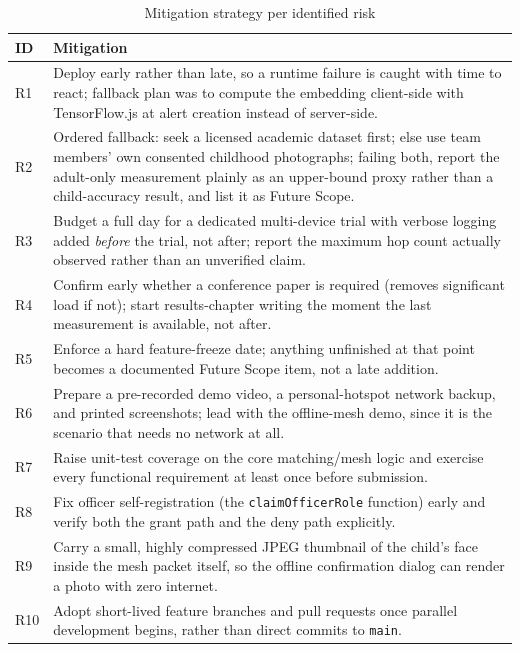 \documentclass[12pt,a4paper,oneside]{report}
\newcommand{\code}[1]{\texttt{#1}}
\begin{document}
\begin{table}[H]
\centering
\caption{Mitigation strategy per identified risk}
\begin{tabular}{|p{0.8cm}|p{11.2cm}|}
\hline
\textbf{ID} & \textbf{Mitigation} \\
\hline
R1 & Deploy early rather than late, so a runtime failure is caught with time to react; fallback plan was to compute the embedding client-side with TensorFlow.js at alert creation instead of server-side. \\ \hline
R2 & Ordered fallback: seek a licensed academic dataset first; else use team members' own consented childhood photographs; failing both, report the adult-only measurement plainly as an upper-bound proxy rather than a child-accuracy result, and list it as Future Scope. \\ \hline
R3 & Budget a full day for a dedicated multi-device trial with verbose logging added \emph{before} the trial, not after; report the maximum hop count actually observed rather than an unverified claim. \\ \hline
R4 & Confirm early whether a conference paper is required (removes significant load if not); start results-chapter writing the moment the last measurement is available, not after. \\ \hline
R5 & Enforce a hard feature-freeze date; anything unfinished at that point becomes a documented Future Scope item, not a late addition. \\ \hline
R6 & Prepare a pre-recorded demo video, a personal-hotspot network backup, and printed screenshots; lead with the offline-mesh demo, since it is the scenario that needs no network at all. \\ \hline
R7 & Raise unit-test coverage on the core matching/mesh logic and exercise every functional requirement at least once before submission. \\ \hline
R8 & Fix officer self-registration (the \code{claimOfficerRole} function) early and verify both the grant path and the deny path explicitly. \\ \hline
R9 & Carry a small, highly compressed JPEG thumbnail of the child's face inside the mesh packet itself, so the offline confirmation dialog can render a photo with zero internet. \\ \hline
R10 & Adopt short-lived feature branches and pull requests once parallel development begins, rather than direct commits to \code{main}. \\
\hline
\end{tabular}
\end{table}
\end{document}
